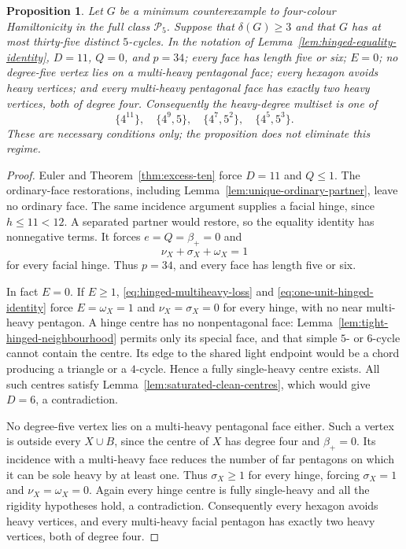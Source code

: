 \documentclass[11pt]{article}
\newtheorem{proposition}[theorem]{Proposition}
\theoremstyle{remark}
\numberwithin{equation}{section}
\numberwithin{table}{section}
\begin{document}
\begin{proposition}\label{prop:thirty-five-frontier}
Let $G$ be a minimum counterexample to four-colour Hamiltonicity in
the full class $\mathcal P_5$.  Suppose that $\delta(G)\ge3$ and that
$G$ has at most thirty-five distinct $5$-cycles.  In the notation of
Lemma~\ref{lem:hinged-equality-identity}, $D=11$, $Q=0$, and $p=34$;
every face has length five or six;
$E=0$; no degree-five vertex lies on a multi-heavy pentagonal face;
every hexagon avoids heavy vertices; and every multi-heavy pentagonal
face has exactly two heavy vertices, both of degree four.  Consequently
the heavy-degree multiset is one of
\[
 \{4^{11}\},\quad \{4^9,5\},\quad
 \{4^7,5^2\},\quad \{4^5,5^3\}.
\]
These are necessary conditions only; the proposition does not eliminate
this regime.
\end{proposition}
\begin{proof}
Euler and Theorem~\ref{thm:excess-ten} force $D=11$ and $Q\le1$.
The ordinary-face restorations, including
Lemma~\ref{lem:unique-ordinary-partner}, leave no ordinary face.
The same incidence argument supplies a facial hinge, since $h\le11<12$.
A separated partner would restore, so the equality identity has
nonnegative terms. It forces $e=Q=\beta_+=0$ and
\begin{equation}\label{eq:one-unit-hinged-identity}
 \nu_X+\sigma_X+\omega_X=1
\end{equation}
for every facial hinge. Thus $p=34$, and every face has length five
or six.

In fact $E=0$. If $E\ge1$,
\eqref{eq:hinged-multiheavy-loss} and
\eqref{eq:one-unit-hinged-identity} force
$E=\omega_X=1$ and $\nu_X=\sigma_X=0$ for every hinge, with no
near multi-heavy pentagon. A hinge centre has no nonpentagonal face:
Lemma~\ref{lem:tight-hinged-neighbourhood} permits only its special
face, and that simple $5$- or $6$-cycle cannot contain the centre.
Its edge to the shared light endpoint would be a chord producing a
triangle or a $4$-cycle. Hence a fully single-heavy centre exists.
All such centres satisfy Lemma~\ref{lem:saturated-clean-centres},
which would give $D=6$, a contradiction.

No degree-five vertex lies on a multi-heavy pentagonal face either.
Such a vertex is outside every $X\cup B$, since the centre of $X$
has degree four and $\beta_+=0$. Its incidence with a multi-heavy face reduces the number of far
pentagons on which it can be sole heavy by at least one. Thus
$\sigma_X\ge1$ for every hinge, forcing
$\sigma_X=1$ and $\nu_X=\omega_X=0$. Again every hinge centre is
fully single-heavy and all the rigidity hypotheses hold, a contradiction.
Consequently every hexagon avoids heavy vertices, and every multi-heavy
facial pentagon has exactly two heavy vertices, both of degree four.


\end{proof}
\end{document}
